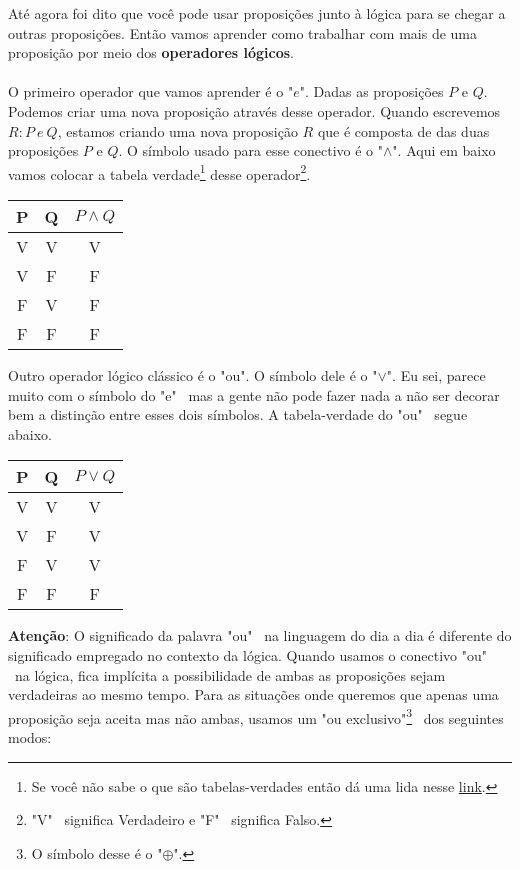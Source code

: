 \documentclass[a4paper,11pt]{book}
\theoremstyle{definition}
\begin{document}
Até agora foi dito que você pode usar proposições junto à lógica para se chegar a outras proposições. Então vamos aprender como trabalhar com mais de uma proposição por meio dos \textbf{operadores lógicos}.
\\
\\
O primeiro operador que vamos aprender é o "$e$". Dadas as proposições $P$ e $Q$. Podemos criar uma nova proposição através desse operador. Quando escrevemos $R: P \ e \ Q$, estamos criando uma nova proposição $R$ que é composta de das duas proposições $P$ e $Q$. O símbolo usado para esse conectivo é o "$\land$". Aqui em baixo vamos colocar a tabela verdade\footnote{Se você não sabe o que são tabelas-verdades então dá uma lida nesse \href{https://www.youtube.com/watch?v=hWEZsyF3ZZc}{link}.} desse operador\footnote{"V" \ significa Verdadeiro e "F" \  significa Falso.}.

\begin{center}
\begin{tabular}{ c c || c }
 P & Q & $P \land Q$ \\ 
 \hline
 V & V & V \\  
 V & F & F \\  
 F & V & F \\  
 F & F & F
\end{tabular}
\end{center}

Outro operador lógico clássico é o "ou". O símbolo dele é o "$\lor$". Eu sei, parece muito com o símbolo do "e" \ mas a  gente não pode fazer nada a não ser decorar bem a distinção entre esses dois símbolos. A tabela-verdade do "ou" \ segue abaixo.

\begin{center}
\begin{tabular}{ c c || c }
 P & Q & $P \lor Q$ \\ 
 \hline
 V & V & V \\  
 V & F & V \\  
 F & V & V \\  
 F & F & F
\end{tabular}
\end{center}

\textbf{Atenção}: O significado da palavra "ou" \ na linguagem do dia a dia é diferente do significado empregado no contexto da lógica. Quando usamos o conectivo "ou" \ na lógica, fica implícita a possibilidade de ambas as proposições sejam verdadeiras ao mesmo tempo. Para as situações onde queremos que apenas uma proposição seja aceita mas não ambas, usamos um "ou exclusivo"\footnote{O símbolo desse é o "$\oplus$".} \ dos seguintes modos: 
\end{document}
